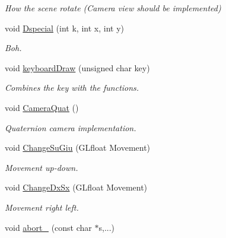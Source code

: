 \begin{DoxyCompactItemize}
\begin{DoxyCompactList}\small\item\em \-How the scene rotate (\-Camera view should be implemented) \end{DoxyCompactList}\item 
\hypertarget{classDraw_ab63c111588287a2a7ccf27b480f49d06}{void \hyperlink{classDraw_ab63c111588287a2a7ccf27b480f49d06}{\-Dspecial} (int k, int x, int y)}\label{classDraw_ab63c111588287a2a7ccf27b480f49d06}

\begin{DoxyCompactList}\small\item\em \-Boh. \end{DoxyCompactList}\item 
\hypertarget{classDraw_a60d9d96dd62e71bfe22654f9d58f834b}{void \hyperlink{classDraw_a60d9d96dd62e71bfe22654f9d58f834b}{keyboard\-Draw} (unsigned char key)}\label{classDraw_a60d9d96dd62e71bfe22654f9d58f834b}

\begin{DoxyCompactList}\small\item\em \-Combines the key with the functions. \end{DoxyCompactList}\item 
\hypertarget{classDraw_aabbfd9c8269f5409bd80617f17ee17a6}{void \hyperlink{classDraw_aabbfd9c8269f5409bd80617f17ee17a6}{\-Camera\-Quat} ()}\label{classDraw_aabbfd9c8269f5409bd80617f17ee17a6}

\begin{DoxyCompactList}\small\item\em \-Quaternion camera implementation. \end{DoxyCompactList}\item 
\hypertarget{classDraw_a62cfcd5895c1c14a27f38007fd00ef28}{void \hyperlink{classDraw_a62cfcd5895c1c14a27f38007fd00ef28}{\-Change\-Su\-Giu} (\-G\-Lfloat \-Movement)}\label{classDraw_a62cfcd5895c1c14a27f38007fd00ef28}

\begin{DoxyCompactList}\small\item\em \-Movement up-\/down. \end{DoxyCompactList}\item 
\hypertarget{classDraw_a8d619bf9e67c2d0684777837c50cd820}{void \hyperlink{classDraw_a8d619bf9e67c2d0684777837c50cd820}{\-Change\-Dx\-Sx} (\-G\-Lfloat \-Movement)}\label{classDraw_a8d619bf9e67c2d0684777837c50cd820}

\begin{DoxyCompactList}\small\item\em \-Movement right left. \end{DoxyCompactList}\item 
\hypertarget{classDraw_a7fe6a9c0c549657aa0d7da2e3c73fa01}{void \hyperlink{classDraw_a7fe6a9c0c549657aa0d7da2e3c73fa01}{abort\-\_\-} (const char $\ast$s,...)}\label{classDraw_a7fe6a9c0c549657aa0d7da2e3c73fa01}


\end{DoxyCompactItemize}
